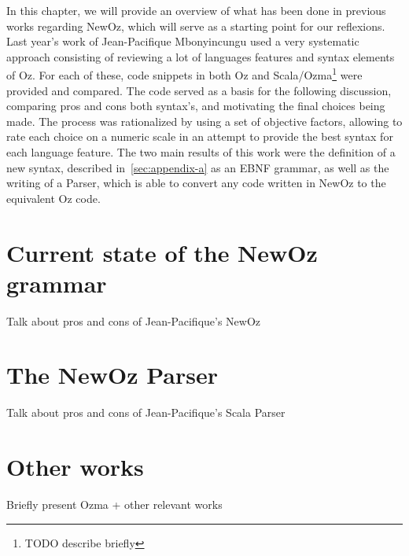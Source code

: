 
In this chapter, we will provide an overview of what has been done in previous works regarding NewOz, which will serve as a starting point for our reflexions.\newline
Last year's work of Jean-Pacifique Mbonyincungu used a very systematic approach consisting of reviewing a lot of languages features and syntax elements of Oz.
For each of these, code snippets in both Oz and Scala/Ozma\footnote{TODO describe briefly} were provided and compared.
The code served as a basis for the following discussion, comparing pros and cons both syntax's, and motivating the final choices being made.
The process was rationalized by using a set of objective factors, allowing to rate each choice on a numeric scale in an attempt to provide the best syntax for each language feature.
\newline
The two main results of this work were the definition of a new syntax, described in~\ref{sec:appendix-a} as an EBNF grammar, as well as the writing of a Parser, which is able to convert any code written in NewOz to the equivalent Oz code.

\section{Current state of the NewOz grammar}\label{sec:ch1CurrentGrammar}
Talk about pros and cons of Jean-Pacifique's NewOz

\section{The NewOz Parser}\label{sec:ch1CurrentParser}
Talk about pros and cons of Jean-Pacifique's Scala Parser

\section{Other works}\label{sec:ch1OtherWorks}
Briefly present Ozma + other relevant works